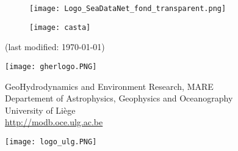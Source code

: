 \begin{titlepage}


\begin{figure}[H]
\centering
\texttt{[image: Logo\_SeaDataNet\_fond\_transparent.png]}
\end{figure}

\begin{center}
\vspace*{1cm}

\colorbox{grey}{
	\parbox[t]{1.0\linewidth}{
	\huge
		\printtitle 
		\vspace*{0.7cm}
	}
}

  	\vspace*{1cm}
  	
\printauthor								%

\vspace*{1cm}


\begin{figure}[H]
\centering
\texttt{[image: casta]}
\end{figure}

\normalsize{(last modified: \today)}


\vfill

\parbox{.20\textwidth}{
\flushleft
\texttt{[image: gherlogo.PNG]}
}\parbox{.60\textwidth}{
\centering
\vspace{.4cm}


\footnotesize{GeoHydrodynamics and Environment Research, MARE\\ 
Departement of Astrophysics, Geophysics and Oceanography\\
University of Li\`{e}ge\\ 
\url{http://modb.oce.ulg.ac.be}
}
\vspace{.15cm}
}\parbox{.20\textwidth}{
\flushright
\texttt{[image: logo\_ulg.PNG]}
}

\end{center}

\end{titlepage}

%
%

